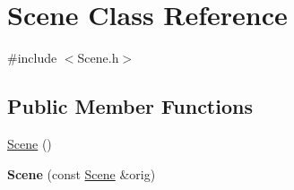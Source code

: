 \hypertarget{classScene}{\section{Scene Class Reference}
\label{classScene}
}


{\ttfamily \#include $<$Scene.\-h$>$}

\subsection*{Public Member Functions}
\begin{DoxyCompactItemize}
\item 
\hyperlink{classScene_ad10176d75a9cc0da56626f682d083507}{Scene} ()
\item 
\hypertarget{classScene_a44eef26bfd4ff2196c0689d30d651ac0}{{\bfseries Scene} (const \hyperlink{classScene}{Scene} \&orig)}\label{classScene_a44eef26bfd4ff2196c0689d30d651ac0}


\end{DoxyCompactItemize}
